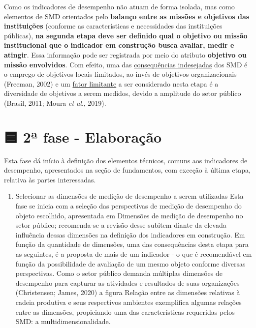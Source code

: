 \documentclass[
  letterpaper,
  DIV=11,
  numbers=noendperiod]{scrreprt}
\providecommand{\tightlist}{%
  \setlength{\itemsep}{0pt}\setlength{\parskip}{0pt}}\usepackage{longtable,booktabs,array}
\begin{document}
Como os indicadores de desempenho não atuam de forma isolada, mas como
elementos de SMD orientados pelo \textbf{balanço entre as missões e
objetivos das instituições} (conforme as características e necessidades
das instituições públicas), \textbf{na segunda etapa deve ser definido
qual o objetivo ou missão institucional que o indicador em construção
busca avaliar, medir e atingir}. Essa informação pode ser registrada por
meio do atributo \textbf{objetivo ou missão envolvidos}. Com efeito, uma
das
\href{/o/AZWDclIWFqqJuBEvyQWk/s/ws6bIBOPv2tLRHdwbB7y/~/changes/788/1.-apresentacao/1.4-consequencias-indesejadas-e-limitacoes-da-medicao-de-desempenho\#consequencias-indesejadas-dos-smd-no-setor-publico}{consequências
indesejadas} dos SMD é o emprego de objetivos locais limitados, ao invés
de objetivos organizacionais (Freeman, 2002) e um
\href{/o/AZWDclIWFqqJuBEvyQWk/s/ws6bIBOPv2tLRHdwbB7y/~/changes/788/1.-apresentacao/1.4-consequencias-indesejadas-e-limitacoes-da-medicao-de-desempenho\#fatores-limitantes-a-medicao-de-desempenho-no-setor-publico}{fator
limitante} a ser considerado nesta etapa é a diversidade de objetivos a
serem medidos, devido a amplitude do setor público (Brasil, 2011; Moura
\emph{et al}., 2019).

\hypertarget{uxaa-fase---elaborauxe7uxe3o}{%
\chapter*{🟦 2ª fase - Elaboração}\label{uxaa-fase---elaborauxe7uxe3o}}


{Esta fase dá início à definição dos elementos técnicos, comuns aos
indicadores de desempenho, apresentados na seção de fundamentos, com
exceção à última etapa, relativa às partes interessadas.}

\begin{enumerate}
\def\labelenumi{\arabic{enumi}.}
\setcounter{enumi}{4}
\tightlist
\item
  Selecionar as dimensões de medição de desempenho a serem utilizadas
  Esta fase se inicia com a seleção das perspectivas de medição de
  desempenho do objeto escolhido, apresentada em Dimensões de medição de
  desempenho no setor público; recomenda-se a revisão desse subitem
  diante da elevada influência dessas dimensões na definição dos
  indicadores em construção. Em função da quantidade de dimensões, uma
  das consequências desta etapa para as seguintes, é a proposta de mais
  de um indicador - o que é recomendável em função da possibilidade de
  avaliação de um mesmo objeto conforme diversas perspectivas. Como o
  setor público demanda múltiplas dimensões de desempenho para capturar
  as atividades e resultados de suas organizações (Christensen; James,
  2020) a figura Relação entre as dimensões relativas à cadeia produtiva
  e seus respectivos ambientes exemplifica algumas relações entre as
  dimensões, propiciando uma das características requeridas pelos SMD: a
  multidimensionalidade.
\end{enumerate}
\end{document}
